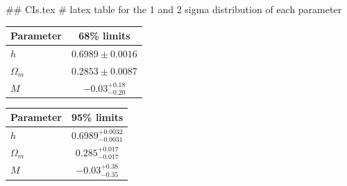 ## CIs.tex
# latex table for the 1 and 2 sigma distribution of each parameter

\begin{tabular} { l  c}
 Parameter &  68\% limits\\
\hline
{\boldmath$h              $} & $0.6989\pm 0.0016          $\\
{\boldmath$\Omega_m       $} & $0.2853\pm 0.0087          $\\
{\boldmath$M              $} & $-0.03^{+0.18}_{-0.20}     $\\
\hline
\end{tabular}

\begin{tabular} { l  c}
 Parameter &  95\% limits\\
\hline
{\boldmath$h              $} & $0.6989^{+0.0032}_{-0.0031}$\\
{\boldmath$\Omega_m       $} & $0.285^{+0.017}_{-0.017}   $\\
{\boldmath$M              $} & $-0.03^{+0.38}_{-0.35}     $\\
\hline
\end{tabular}
